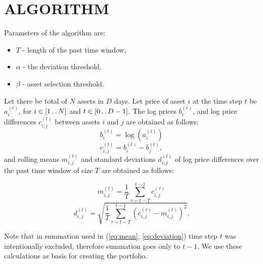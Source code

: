 \documentclass[letterpaper, 10 pt, conference]{ieeeconf}
\newcommand{\upto}{\mathinner {\ldotp \ldotp}}
\begin{document}
  \section{ALGORITHM} 
  
  Parameters of the algorithm are:
  \begin{itemize}
    \item $T$ - length of the past time window,
    \item $\alpha$ - the deviation threshold,
    \item $\beta$ - asset selection threshold.
  \end{itemize}
  
  Let there be total of $N$ assets in $D$ days.
  Let price of asset $i$ at the time step $t$ be $a_i^{(t)}$, for $i \in {\left[1 \upto N\right]}$ and $t \in {\left[0 \upto D-1\right]}$.
  The log prices $b_i^{(t)}$, and log price differences $c_{i,j}^{(t)}$ between assets $i$ and $j$ are obtained as follows:
  \begin{equation} b_i^{(t)} = \log\left(a_i^{(t)}\right) \end{equation}
  \begin{equation} c_{i,j}^{(t)} = b_i^{(t)} - b_j^{(t)}, \end{equation}
  and rolling means $m_{i,j}^{(t)}$ and standard deviations $d_{i,j}^{(t)}$ of log price differences over the past time window of size $T$ are obtained as follows:
   
  \begin{equation}
    \label{eq:mean}
    m_{i,j}^{(t)} = \frac{1}{T}\sum_{\tau = t - T}^{t - 1} c_{i,j}^{(\tau)}
  \end{equation}
  \begin{equation}
    \label{eq:deviation}
    d_{i,j}^{(t)} = \sqrt{\frac{1}{T}\sum_{\tau=t - T}^{t - 1} \left(c_{i,j}^{(\tau)} - m_{i,j}^{(t)} \right)^2}.
  \end{equation}
  
  Note that in summation used in (\ref{eq:mean}, \ref{eq:deviation}) time step $t$ was intentionally excluded, therefore summation goes only to $t - 1$.
  We use these calculations as basis for creating the portfolio.
  
\end{document}
